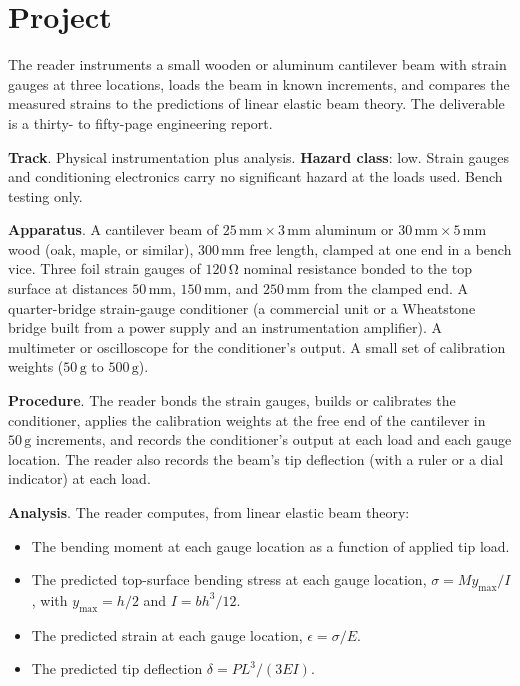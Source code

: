 

\section{Project}

\begin{project}
The reader instruments a small wooden or aluminum cantilever beam
with strain gauges at three locations, loads the beam in known
increments, and compares the measured strains to the predictions of
linear elastic beam theory. The deliverable is a thirty- to
fifty-page engineering report.

\textbf{Track}. Physical instrumentation plus analysis.
\textbf{Hazard class}: low. Strain gauges and conditioning
electronics carry no significant hazard at the loads used. Bench
testing only.

\textbf{Apparatus}. A cantilever beam of $25\,\si{\milli\meter} \times
3\,\si{\milli\meter}$ aluminum or $30\,\si{\milli\meter} \times 5\,
\si{\milli\meter}$ wood (oak, maple, or similar), $300\,\si{\milli
\meter}$ free length, clamped at one end in a bench vice. Three foil
strain gauges of $120\,\si{\ohm}$ nominal resistance bonded to the
top surface at distances $50\,\si{\milli\meter}$, $150\,\si{
\milli\meter}$, and $250\,\si{\milli\meter}$ from the clamped end. A
quarter-bridge strain-gauge conditioner (a commercial unit or a
Wheatstone bridge built from a power supply and an instrumentation
amplifier). A multimeter or oscilloscope for the conditioner's
output. A small set of calibration weights ($50\,\si{\gram}$ to
$500\,\si{\gram}$).

\textbf{Procedure}. The reader bonds the strain gauges, builds or
calibrates the conditioner, applies the calibration weights at the
free end of the cantilever in $50\,\si{\gram}$ increments, and
records the conditioner's output at each load and each gauge
location. The reader also records the beam's tip deflection (with
a ruler or a dial indicator) at each load.

\textbf{Analysis}. The reader computes, from linear elastic beam
theory:

\begin{itemize}[leftmargin=*]
  \item The bending moment at each gauge location as a function of
    applied tip load.
  \item The predicted top-surface bending stress at each gauge
    location, $\sigma = M y_{\max} / I$, with $y_{\max} = h/2$ and
    $I = bh^3/12$.
  \item The predicted strain at each gauge location, $\epsilon =
    \sigma / E$.
  \item The predicted tip deflection $\delta = PL^3 / (3EI)$.
\end{itemize}


\end{project}
